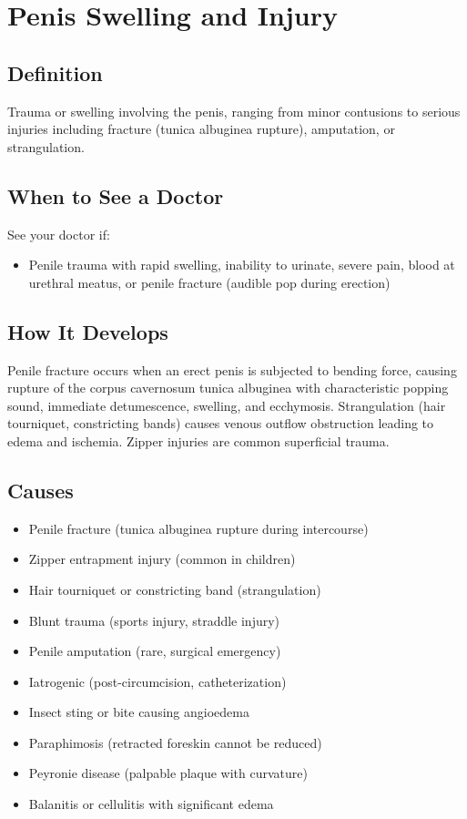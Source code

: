 \chapter{Penis Swelling and Injury}

\section*{Definition}
Trauma or swelling involving the penis, ranging from minor contusions to serious injuries including fracture (tunica albuginea rupture), amputation, or strangulation.

\section*{When to See a Doctor}
See your doctor if:
\begin{itemize}
  \item Penile trauma with rapid swelling, inability to urinate, severe pain, blood at urethral meatus, or penile fracture (audible pop during erection)
\end{itemize}

\section*{How It Develops}
Penile fracture occurs when an erect penis is subjected to bending force, causing rupture of the corpus cavernosum tunica albuginea with characteristic popping sound, immediate detumescence, swelling, and ecchymosis. Strangulation (hair tourniquet, constricting bands) causes venous outflow obstruction leading to edema and ischemia. Zipper injuries are common superficial trauma.

\section*{Causes}
\begin{itemize}
  \item Penile fracture (tunica albuginea rupture during intercourse)
  \item Zipper entrapment injury (common in children)
  \item Hair tourniquet or constricting band (strangulation)
  \item Blunt trauma (sports injury, straddle injury)
  \item Penile amputation (rare, surgical emergency)
  \item Iatrogenic (post-circumcision, catheterization)
  \item Insect sting or bite causing angioedema
  \item Paraphimosis (retracted foreskin cannot be reduced)
  \item Peyronie disease (palpable plaque with curvature)
  \item Balanitis or cellulitis with significant edema
\end{itemize}

